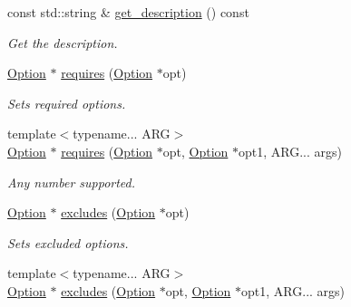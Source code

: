 \begin{DoxyCompactItemize}
\mbox{\label{class_c_l_i_1_1_option_ad79474a3c1cc8a73b12f80c6e31ee3af}} 
const std\+::string \& \hyperlink{class_c_l_i_1_1_option_ad79474a3c1cc8a73b12f80c6e31ee3af}{get\+\_\+description} () const
\begin{DoxyCompactList}\small\item\em Get the description. \end{DoxyCompactList}\item 
\mbox{\label{class_c_l_i_1_1_option_abee0e47f0df529a1d0b2cc9ed2ca33d9}} 
\hyperlink{class_c_l_i_1_1_option}{Option} $\ast$ \hyperlink{class_c_l_i_1_1_option_abee0e47f0df529a1d0b2cc9ed2ca33d9}{requires} (\hyperlink{class_c_l_i_1_1_option}{Option} $\ast$opt)
\begin{DoxyCompactList}\small\item\em Sets required options. \end{DoxyCompactList}\item 
\mbox{\label{class_c_l_i_1_1_option_a6edf22002aebe6e0ac69c61283be4ec5}} 
{\footnotesize template$<$typename... A\+RG$>$ }\\\hyperlink{class_c_l_i_1_1_option}{Option} $\ast$ \hyperlink{class_c_l_i_1_1_option_a6edf22002aebe6e0ac69c61283be4ec5}{requires} (\hyperlink{class_c_l_i_1_1_option}{Option} $\ast$opt, \hyperlink{class_c_l_i_1_1_option}{Option} $\ast$opt1, A\+R\+G... args)
\begin{DoxyCompactList}\small\item\em Any number supported. \end{DoxyCompactList}\item 
\mbox{\label{class_c_l_i_1_1_option_a9597b8271ebc4ad41c2e86f31834a1a3}} 
\hyperlink{class_c_l_i_1_1_option}{Option} $\ast$ \hyperlink{class_c_l_i_1_1_option_a9597b8271ebc4ad41c2e86f31834a1a3}{excludes} (\hyperlink{class_c_l_i_1_1_option}{Option} $\ast$opt)
\begin{DoxyCompactList}\small\item\em Sets excluded options. \end{DoxyCompactList}\item 
\mbox{\label{class_c_l_i_1_1_option_a1af39fb37a32be1b95f9fe582744d471}} 
{\footnotesize template$<$typename... A\+RG$>$ }\\\hyperlink{class_c_l_i_1_1_option}{Option} $\ast$ \hyperlink{class_c_l_i_1_1_option_a1af39fb37a32be1b95f9fe582744d471}{excludes} (\hyperlink{class_c_l_i_1_1_option}{Option} $\ast$opt, \hyperlink{class_c_l_i_1_1_option}{Option} $\ast$opt1, A\+R\+G... args)

\end{DoxyCompactItemize}
